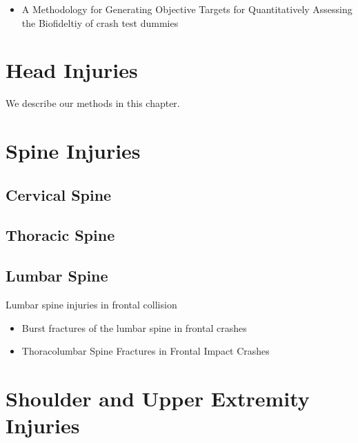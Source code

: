 \documentclass[]{book}
\providecommand{\tightlist}{%
  \setlength{\itemsep}{0pt}\setlength{\parskip}{0pt}}
\begin{document}
\begin{itemize}
\tightlist
\item
  A Methodology for Generating Objective Targets for Quantitatively Assessing the Biofideltiy of crash test dummies \citep{Rhule2009}
\end{itemize}

\hypertarget{head-injuries-1}{%
\chapter{Head Injuries}\label{head-injuries-1}}

We describe our methods in this chapter.

\hypertarget{spine-injuries-1}{%
\chapter{Spine Injuries}\label{spine-injuries-1}}

\hypertarget{cervical-spine-1}{%
\section{Cervical Spine}\label{cervical-spine-1}}

\hypertarget{thoracic-spine-1}{%
\section{Thoracic Spine}\label{thoracic-spine-1}}

\hypertarget{lumbar-spine-1}{%
\section{Lumbar Spine}\label{lumbar-spine-1}}

Lumbar spine injuries in frontal collision

\begin{itemize}
\item
  Burst fractures of the lumbar spine in frontal crashes \citep{Kaufman_2013}
\item
  Thoracolumbar Spine Fractures in Frontal Impact Crashes \citep{Pintar2012}
\end{itemize}

\hypertarget{shoulder-and-upper-extremity-injuries-1}{%
\chapter{Shoulder and Upper Extremity Injuries}\label{shoulder-and-upper-extremity-injuries-1}}
\end{document}
